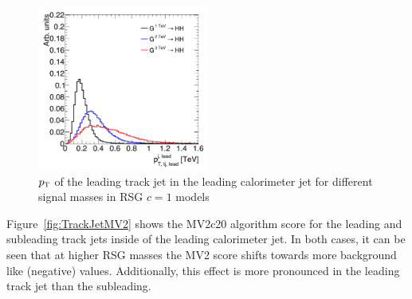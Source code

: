\begin{figure}[h!]
  \centering
  \captionsetup{justification=centering}

  \includegraphics[width=0.5\textwidth]{figures/TrackJetPt}
  \caption{$p_{\textrm{\footnotesize\sc t}}$ of the leading track jet in the leading calorimeter jet for different signal masses in RSG $c=1$ models}
  \label{fig:TrackJetPt}
\end{figure}

Figure~\ref{fig:TrackJetMV2} shows the MV2c20 algorithm score for the leading and subleading track jets inside of the leading calorimeter jet. In both cases, it can be seen that at higher RSG masses the MV2 score shifts towards more background like (negative) values. Additionally, this effect is more pronounced in the leading track jet than the subleading. 

